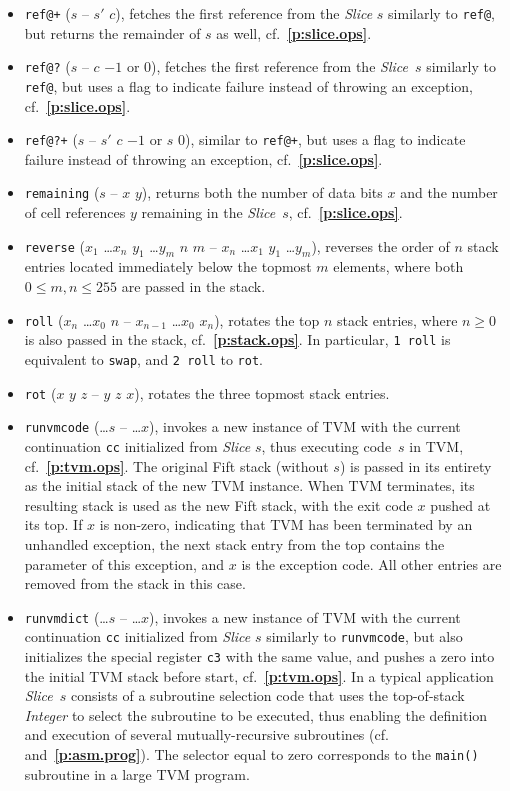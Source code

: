 \documentclass[12pt,oneside]{article}
\def\refpoint#1{{\rm\textbf{\ref{#1}}}}
\let\ptref=\refpoint
\begin{document}
\begin{itemize}
\item {\tt ref@+} ($s$ -- $s'$ $c$), fetches the first reference from the {\em Slice\/} $s$ similarly to {\tt ref@}, but returns the remainder of $s$ as well, cf.~\ptref{p:slice.ops}.
\item {\tt ref@?} ($s$ -- $c$ $-1$ or $0$), fetches the first reference from the {\em Slice}~$s$ similarly to {\tt ref@}, but uses a flag to indicate failure instead of throwing an exception, cf.~\ptref{p:slice.ops}.
\item {\tt ref@?+} ($s$ -- $s'$ $c$ $-1$ or $s$ $0$), similar to {\tt ref@+}, but uses a flag to indicate failure instead of throwing an exception, cf.~\ptref{p:slice.ops}.
\item {\tt remaining} ($s$ -- $x$ $y$), returns both the number of data bits $x$ and the number of cell references $y$ remaining in the {\em Slice}~$s$, cf.~\ptref{p:slice.ops}.
\item {\tt reverse} ($x_1$ \dots $x_n$ $y_1$ \dots $y_m$ $n$ $m$ -- $x_n$ \dots $x_1$ $y_1$ \dots $y_m$), reverses the order of $n$ stack entries located immediately below the topmost $m$ elements, where both $0\leq m,n\leq 255$ are passed in the stack.
\item {\tt roll} ($x_n$ \dots $x_0$ $n$ -- $x_{n-1}$ \dots $x_0$ $x_n$), rotates the top $n$ stack entries, where $n\geq0$ is also passed in the stack, cf.~\ptref{p:stack.ops}. In particular, {\tt 1 roll} is equivalent to {\tt swap}, and {\tt 2 roll} to {\tt rot}.
\item {\tt rot} ($x$ $y$ $z$ -- $y$ $z$ $x$), rotates the three topmost stack entries.
\item {\tt runvmcode} (\dots $s$ -- \dots $x$), invokes a new instance of TVM with the current continuation {\tt cc} initialized from {\em Slice\/} $s$, thus executing code~$s$ in TVM, cf.~\ptref{p:tvm.ops}. The original Fift stack (without $s$) is passed in its entirety as the initial stack of the new TVM instance. When TVM terminates, its resulting stack is used as the new Fift stack, with the exit code $x$ pushed at its top. If $x$ is non-zero, indicating that TVM has been terminated by an unhandled exception, the next stack entry from the top contains the parameter of this exception, and $x$ is the exception code. All other entries are removed from the stack in this case.
\item {\tt runvmdict} (\dots $s$ -- \dots $x$), invokes a new instance of TVM with the current continuation {\tt cc} initialized from {\em Slice\/} $s$ similarly to {\tt runvmcode}, but also initializes the special register {\tt c3} with the same value, and pushes a zero into the initial TVM stack before start, cf.~\ptref{p:tvm.ops}. In a typical application {\em Slice\/}~$s$ consists of a subroutine selection code that uses the top-of-stack {\em Integer\/} to select the subroutine to be executed, thus enabling the definition and execution of several mutually-recursive subroutines (cf.~\cite[4.6]{TVM} and~\ptref{p:asm.prog}). The selector equal to zero corresponds to the {\tt main()} subroutine in a large TVM program.

\end{itemize}
\end{document}
